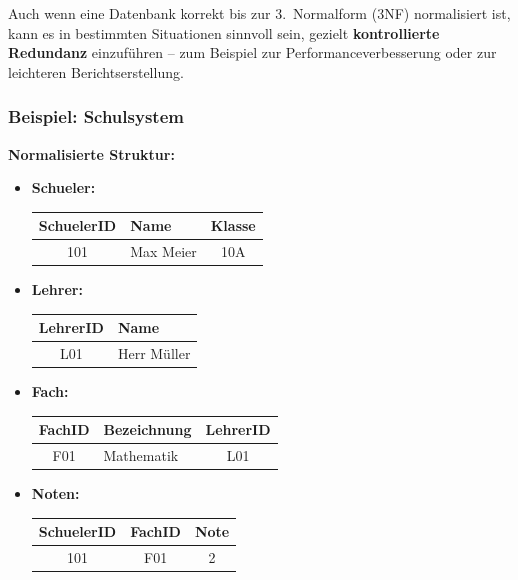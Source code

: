 \documentclass[a4paper,12pt]{article}
\begin{document}
\begin{enumerate}
			
			
			Auch wenn eine Datenbank korrekt bis zur 3.\ Normalform (3NF) normalisiert ist, kann es in bestimmten Situationen sinnvoll sein, gezielt \textbf{kontrollierte Redundanz} einzuführen – zum Beispiel zur Performanceverbesserung oder zur leichteren Berichtserstellung.
			
			\subsubsection*{Beispiel: Schulsystem}
			
			\textbf{Normalisierte Struktur:}
			
			\begin{itemize}
				\item \textbf{Schueler:}
				\begin{tabular}{|c|l|c|}
					\hline
					\textbf{SchuelerID} & \textbf{Name} & \textbf{Klasse} \\
					\hline
					101 & Max Meier & 10A \\
					\hline
				\end{tabular}
				
				\vspace{0.5em}
				\item \textbf{Lehrer:}
				\begin{tabular}{|c|l|}
					\hline
					\textbf{LehrerID} & \textbf{Name} \\
					\hline
					L01 & Herr Müller \\
					\hline
				\end{tabular}
				
				\vspace{0.5em}
				\item \textbf{Fach:}
				\begin{tabular}{|c|l|c|}
					\hline
					\textbf{FachID} & \textbf{Bezeichnung} & \textbf{LehrerID} \\
					\hline
					F01 & Mathematik & L01 \\
					\hline
				\end{tabular}
				
				\vspace{0.5em}
				\item \textbf{Noten:}
				\begin{tabular}{|c|c|c|}
					\hline
					\textbf{SchuelerID} & \textbf{FachID} & \textbf{Note} \\
					\hline
					101 & F01 & 2 \\
					\hline
				\end{tabular}
			\end{itemize}
			

\end{enumerate}
\end{document}
